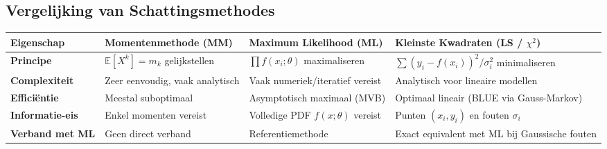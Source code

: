 \documentclass[11pt,a4paper]{article}
\newcommand{\E}{\mathbb{E}}
\begin{document}
\subsection{Vergelijking van Schattingsmethodes}
\begin{table}[H]
    \centering
    \small
    \begin{tabularx}{\textwidth}{lXXX}
        \toprule
        \textbf{Eigenschap} & \textbf{Momentenmethode (MM)} & \textbf{Maximum Likelihood (ML)} & \textbf{Kleinste Kwadraten (LS / $\chi^2$)} \\
        \midrule
        \textbf{Principe} & $\E[X^k] = m_k$ gelijkstellen & $\prod f(x_i;\theta)$ maximaliseren & $\sum (y_i - f(x_i))^2/\sigma_i^2$ minimaliseren \\
        \addlinespace
        \textbf{Complexiteit} & Zeer eenvoudig, vaak analytisch & Vaak numeriek/iteratief vereist & Analytisch voor lineaire modellen \\
        \addlinespace
        \textbf{Efficiëntie} & Meestal suboptimaal & Asymptotisch maximaal (MVB) & Optimaal lineair (BLUE via Gauss-Markov) \\
        \addlinespace
        \textbf{Informatie-eis} & Enkel momenten vereist & Volledige PDF $f(x;\theta)$ vereist & Punten $(x_i, y_i)$ en fouten $\sigma_i$ \\
        \addlinespace
        \textbf{Verband met ML} & Geen direct verband & Referentiemethode & Exact equivalent met ML bij Gaussische fouten \\
        \bottomrule
    \end{tabularx}
\end{table}
\end{document}
